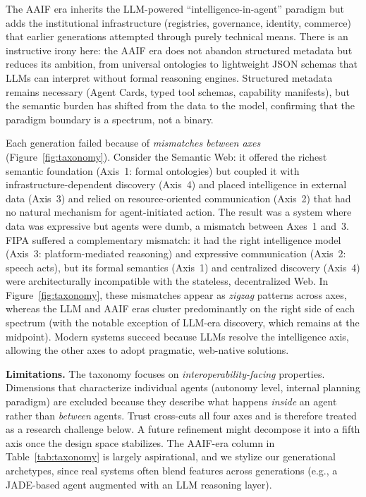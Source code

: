 \documentclass{IEEEcsmag}
\begin{document}
The AAIF era inherits the LLM-powered ``intelligence-in-agent'' paradigm but adds the institutional infrastructure (registries, governance, identity, commerce) that earlier generations attempted through purely technical means.  There is an instructive irony here: the AAIF era does not abandon structured metadata but reduces its ambition, from universal ontologies to lightweight JSON schemas that LLMs can interpret without formal reasoning engines.  Structured metadata remains necessary (Agent Cards, typed tool schemas, capability manifests), but the semantic burden has shifted from the data to the model, confirming that the paradigm boundary is a spectrum, not a binary.

Each generation failed because of \emph{mismatches between axes} (Figure~\ref{fig:taxonomy}).  Consider the Semantic Web: it offered the richest semantic foundation (Axis~1: formal ontologies) but coupled it with infrastructure-dependent discovery (Axis~4) and placed intelligence in external data (Axis~3) and relied on resource-oriented communication (Axis~2) that had no natural mechanism for agent-initiated action.  The result was a system where data was expressive but agents were dumb, a mismatch between Axes~1 and~3.  FIPA suffered a complementary mismatch: it had the right intelligence model (Axis~3: platform-mediated reasoning) and expressive communication (Axis~2: speech acts), but its formal semantics (Axis~1) and centralized discovery (Axis~4) were architecturally incompatible with the stateless, decentralized Web.  In Figure~\ref{fig:taxonomy}, these mismatches appear as \emph{zigzag} patterns across axes, whereas the LLM and AAIF eras cluster predominantly on the right side of each spectrum (with the notable exception of LLM-era discovery, which remains at the midpoint).  Modern systems succeed because LLMs resolve the intelligence axis, allowing the other axes to adopt pragmatic, web-native solutions.

\textbf{Limitations.}  The taxonomy focuses on \emph{interoperability-facing} properties. Dimensions that characterize individual agents (autonomy level, internal planning paradigm) are excluded because they describe what happens \emph{inside} an agent rather than \emph{between} agents.  Trust cross-cuts all four axes and is therefore treated as a research challenge below. A future refinement might decompose it into a fifth axis once the design space stabilizes.  The AAIF-era column in Table~\ref{tab:taxonomy} is largely aspirational, and we stylize our generational archetypes, since real systems often blend features across generations (e.g., a JADE-based agent augmented with an LLM reasoning layer).
\end{document}
